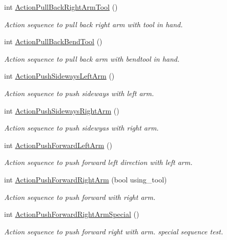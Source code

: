 \begin{DoxyCompactItemize}
int \hyperlink{structManipulate_ae5d9a3633a709aee251e8f73126b7362}{Action\+Pull\+Back\+Right\+Arm\+Tool} ()
\begin{DoxyCompactList}\small\item\em Action sequence to pull back right arm with tool in hand. \end{DoxyCompactList}\item 
int \hyperlink{structManipulate_ab094520fdf91df726e8458724bd10eaf}{Action\+Pull\+Back\+Bend\+Tool} ()
\begin{DoxyCompactList}\small\item\em Action sequence to pull back arm with bendtool in hand. \end{DoxyCompactList}\item 
int \hyperlink{structManipulate_a0bec14a9892d05383bf8df05ce2c5890}{Action\+Push\+Sideways\+Left\+Arm} ()
\begin{DoxyCompactList}\small\item\em Action sequence to push sideways with left arm. \end{DoxyCompactList}\item 
int \hyperlink{structManipulate_a5a401d36a7b32fb608c0d432091fc3dc}{Action\+Push\+Sideways\+Right\+Arm} ()
\begin{DoxyCompactList}\small\item\em Action sequence to push sidewyas with right arm. \end{DoxyCompactList}\item 
int \hyperlink{structManipulate_aee20bd1d48720fa28e12abbe42fdef57}{Action\+Push\+Forward\+Left\+Arm} ()
\begin{DoxyCompactList}\small\item\em Action sequence to push forward left direction with left arm. \end{DoxyCompactList}\item 
int \hyperlink{structManipulate_a128e631593f945ea431116aef97a4511}{Action\+Push\+Forward\+Right\+Arm} (bool using\+\_\+tool)
\begin{DoxyCompactList}\small\item\em Action sequence to push forward with right arm. \end{DoxyCompactList}\item 
int \hyperlink{structManipulate_ac49e6b0ca61223d49110e1dbf02f086e}{Action\+Push\+Forward\+Right\+Arm\+Special} ()
\begin{DoxyCompactList}\small\item\em Action sequence to push forward right with arm. special sequence test. \end{DoxyCompactList}\item 

\end{DoxyCompactItemize}
